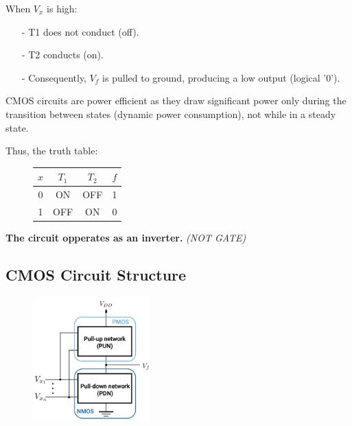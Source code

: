 \documentclass[12pt,openany, tikz,border=10pt]{book}
\begin{document}
			      	When \( V_x \) is high:
			      	\begin{itemize}
			      		\item[-] T1 does not conduct (off).
			      		\item[-] T2 conducts (on).
			      		\item[-] Consequently, \( V_f \) is pulled to ground, producing a low output (logical '0').
			      	\end{itemize}
			      	  
			      	CMOS circuits are power efficient as they draw significant power only during the transition between states (dynamic power consumption), not while in a steady state.
			      	  
			      	\vspace*{10px}
			      	
			      	Thus, the truth table:
			      	\begin{figure}[h]
			      		\centering
			      		\begin{tabular}{c|c|c|c}
			      			\( x \) & \( T_1 \) & \( T_2 \) & \( f \) \\
			      			\hline
			      			0       & ON        & OFF       & 1       \\
			      			1       & OFF       & ON        & 0       \\
			      		\end{tabular}
			      	\end{figure}
			      	
			      	
			      	\textbf{The circuit opperates as an inverter. } \textit{(NOT GATE)}
			      	
			      	\newpage
			      	\subsection{CMOS Circuit Structure}
			      	\begin{figure}[h]
			      		\centering
			      		\includegraphics[width=0.4\textwidth]{circuits/9.1.4.png} %
			      	\end{figure}
			      	
\end{document}
